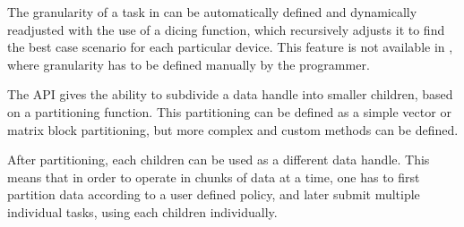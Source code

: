 \documentclass[main.tex]{subfiles}
\begin{document}
The granularity of a task in \gama can be automatically defined and dynamically  readjusted with the use of a dicing function, which recursively adjusts it to find the best case scenario for each particular device. This feature is not available in \starpu, where granularity has to be defined manually by the programmer.

The API gives the ability to subdivide a data handle into smaller children, based on a partitioning function. This partitioning can be defined as a simple vector or matrix block partitioning, but more complex and custom methods can be defined.

After partitioning, each children can be used as a different data handle. This means that in order to operate in chunks of data at a time, one has to first partition data according to a user defined policy, and later submit multiple individual tasks, using each children individually.
\end{document}
